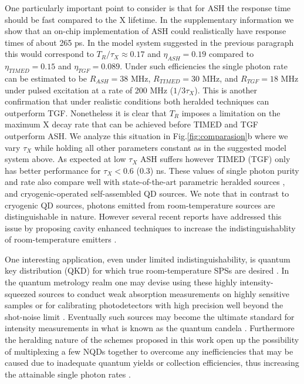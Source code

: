 \documentclass[journal=nalefd,manuscript=letter]{achemso}
\begin{document}
One particularly important point to consider is that for ASH the response time should be fast compared to the X lifetime. 
In the supplementary information \cite{supp} we show that an on-chip implementation of ASH could realistically have response times of about 265 ps. 
In the model system suggested in the previous paragraph this would correspond to $T_R/\tau_X \approx 0.17$ and $\eta_{ASH}=0.19$ compared to $\eta_{TIMED}=0.15$ and $\eta_{TGF}=0.089$.
Under such efficiencies the single photon rate can be estimated to be $R_{ASH}= 38$ MHz, $R_{TIMED}=30$ MHz, and $R_{TGF}=18$ MHz under pulsed excitation at a rate of 200 MHz ($1/3\tau_X$).
This is another confirmation that under realistic conditions both heralded techniques can outperform TGF.
Nonetheless it is clear that $T_R$ imposes a limitation on the maximum X decay rate that can be achieved before TIMED and TGF outperform ASH.
We analyze this situation in Fig.\ref{fig:comparasion}b where we vary $\tau_X$ while holding all other parameters constant as in the suggested model system above.
As expected at low $\tau_X$ ASH suffers however TIMED (TGF) only has better performance for $\tau_X <$0.6 (0.3) ns. 
These values of single photon purity and rate also compare well with state-of-the-art parametric heralded sources \cite{Ngah2015Ultra-fastTechnology,Wang2016ExperimentalEntanglement,Joshi2018FrequencySources}, and cryogenic-operated self-assembled QD \cite{Ding2016,Somaschi2016NearState} sources.
We note that in contrast to cryogenic QD sources, photons emitted from room-temperature sources are distinguishable in nature. However several recent reports have addressed this issue by proposing cavity enhanced techniques to increase the indistinguishablity of room-temperature emitters \cite{Grange2015,Wein2018FeasibilityCavities,Choi2018HighlyRegime}. 

One interesting application, even under limited indistinguishability, is quantum key distribution (QKD) for which true room-temperature SPSs are desired \cite{Takemoto2015QuantumDetectors}.
In the quantum metrology realm one may devise using these highly intensity-squeezed sources to conduct weak absorption measurements on highly sensitive samples or for calibrating photodetectors with high precision well beyond the shot-noise limit \cite{Lounis2005}. 
Eventually such sources may become the ultimate standard for intensity measurements in what is known as the quantum candela \cite{Cheung2007TheRadiation}.
Furthermore the heralding nature of the schemes proposed in this work open up the possibility of multiplexing a few NQDs together to overcome any inefficiencies that may be caused due to inadequate quantum yields or collection efficiencies, thus increasing the attainable single photon rates \cite{supp}.
\end{document}
